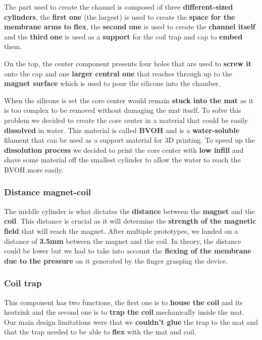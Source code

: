 The part used to create the channel is composed of three \textbf{different-sized cylinders}, the \textbf{first one} (the largest) is used to create the \textbf{space for the membrane arms to flex}, the \textbf{second one} is used to create the \textbf{channel itself} and the \textbf{third} \textbf{one} is used as a \textbf{support} for the coil trap and cap to \textbf{embed} them.

On the top, the center component presents four holes that are used to \textbf{screw it} onto the cap and one \textbf{larger central one} that reaches through up to the \textbf{magnet surface} which is used to pour the silicone into the chamber.

When the silicone is set the core center would remain \textbf{stuck into the mat} as it is too complex to be removed without damaging the mat itself.
To solve this problem we decided to create the core center in a material that could be easily \textbf{dissolved} in water.
This material is called \textbf{BVOH} and is a \textbf{water-soluble} filament that can be used as a support material for 3D printing.
To speed up the \textbf{dissolution process} we decided to print the core center with \textbf{low infill} and shave some material off the smallest cylinder to allow the water to reach the BVOH more easily.

\subsubsection{Distance magnet-coil}
The middle cylinder is what dictates the \textbf{distance} between the \textbf{magnet} and the \textbf{coil}.
This distance is crucial as it will determine the \textbf{strength of the magnetic field} that will reach the magnet.
After multiple prototypes, we landed on a distance of \textbf{3.5mm} between the magnet and the coil.
In theory, the distance could be lower but we had to take into account the \textbf{flexing of the membrane due to the pressure} on it generated by the finger grasping the device.

\subsubsection{Coil trap}
This component has two functions, the first one is to \textbf{house the coil} and its heatsink and the second one is to \textbf{trap the coil} mechanically inside the mat.
Our main design limitations were that we \textbf{couldn't glue} the trap to the mat and that the trap needed to be able to \textbf{flex} with the mat and coil.

